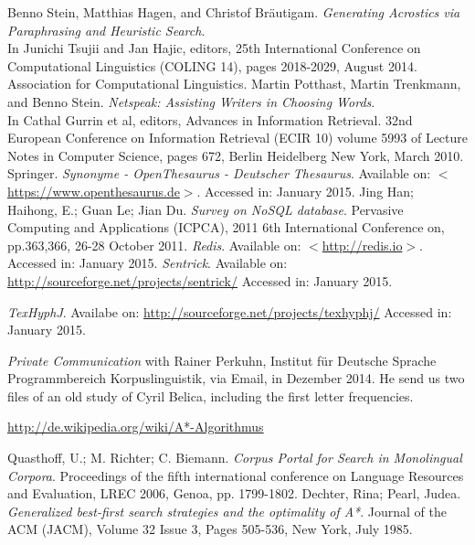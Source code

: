 \documentclass[11pt]{reportAlternative}
\begin{document}
\begin{thebibliography}{1}
	Benno Stein, Matthias Hagen, and Christof Bräutigam. \emph{Generating Acrostics via Paraphrasing and Heuristic Search}. \\
	In Junichi Tsujii and Jan Hajic, editors, 25th International Conference on Computational Linguistics (COLING 14), pages 2018-2029, August 2014. Association for Computational Linguistics.
	Martin Potthast, Martin Trenkmann, and Benno Stein.
	\emph{Netspeak: Assisting Writers in Choosing Words}. \\
	In Cathal Gurrin et al, editors, Advances in Information Retrieval. 32nd European Conference on Information Retrieval (ECIR 10) volume 5993 of Lecture Notes in Computer Science, pages 672, Berlin Heidelberg New York, March 2010. Springer.
	\emph{Synonyme - OpenThesaurus - Deutscher Thesaurus}.
	Available on: $<$\url{https://www.openthesaurus.de}$>$.
	Accessed in: January 2015.
	Jing Han; Haihong, E.; Guan Le; Jian Du. \emph{Survey on NoSQL database}. Pervasive Computing and Applications (ICPCA), 2011 6th International Conference on, pp.363,366, 26-28 October 2011.
	\emph{Redis}.
	Available on: $<$\url{http://redis.io}$>$.
	Accessed in: January 2015.
\emph{Sentrick}.
Available on: \url{http://sourceforge.net/projects/sentrick/}
Accessed in: January 2015.


\emph{TexHyphJ}.
Availabe on: \url{http://sourceforge.net/projects/texhyphj/}
Accessed in: January 2015.

\emph{Private Communication} with Rainer Perkuhn,
Institut für Deutsche Sprache Programmbereich Korpuslinguistik, via Email, in Dezember 2014. He send us two files of an old study of Cyril Belica, including the first letter frequencies.  

\url{http://de.wikipedia.org/wiki/A*-Algorithmus}














	Quasthoff, U.; M. Richter; C. Biemann. \emph{Corpus Portal for Search in Monolingual Corpora}. Proceedings of the fifth international conference on Language Resources and Evaluation, LREC 2006, Genoa, pp. 1799-1802.
	Dechter, Rina; Pearl, Judea. \emph{Generalized best-first search strategies and the optimality of A*}. Journal of the ACM (JACM), Volume 32 Issue 3, Pages 505-536, New York, July 1985.
\end{thebibliography}

\end{document}
